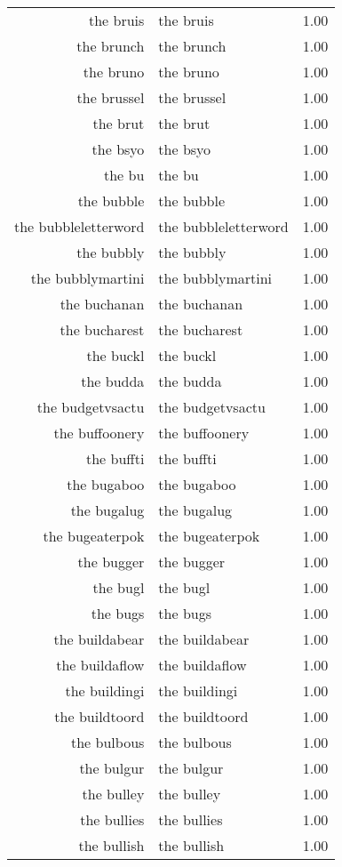 \begin{table}[ht]
\begin{tabular}{rlr}
  the bruis & the bruis & 1.00 \\ 
  the brunch & the brunch & 1.00 \\ 
  the bruno & the bruno & 1.00 \\ 
  the brussel & the brussel & 1.00 \\ 
  the brut & the brut & 1.00 \\ 
  the bsyo & the bsyo & 1.00 \\ 
  the bu & the bu & 1.00 \\ 
  the bubble & the bubble & 1.00 \\ 
  the bubbleletterword & the bubbleletterword & 1.00 \\ 
  the bubbly & the bubbly & 1.00 \\ 
  the bubblymartini & the bubblymartini & 1.00 \\ 
  the buchanan & the buchanan & 1.00 \\ 
  the bucharest & the bucharest & 1.00 \\ 
  the buckl & the buckl & 1.00 \\ 
  the budda & the budda & 1.00 \\ 
  the budgetvsactu & the budgetvsactu & 1.00 \\ 
  the buffoonery & the buffoonery & 1.00 \\ 
  the buffti & the buffti & 1.00 \\ 
  the bugaboo & the bugaboo & 1.00 \\ 
  the bugalug & the bugalug & 1.00 \\ 
  the bugeaterpok & the bugeaterpok & 1.00 \\ 
  the bugger & the bugger & 1.00 \\ 
  the bugl & the bugl & 1.00 \\ 
  the bugs & the bugs & 1.00 \\ 
  the buildabear & the buildabear & 1.00 \\ 
  the buildaflow & the buildaflow & 1.00 \\ 
  the buildingi & the buildingi & 1.00 \\ 
  the buildtoord & the buildtoord & 1.00 \\ 
  the bulbous & the bulbous & 1.00 \\ 
  the bulgur & the bulgur & 1.00 \\ 
  the bulley & the bulley & 1.00 \\ 
  the bullies & the bullies & 1.00 \\ 
  the bullish & the bullish & 1.00 \\ 

\end{tabular}
\end{table}
